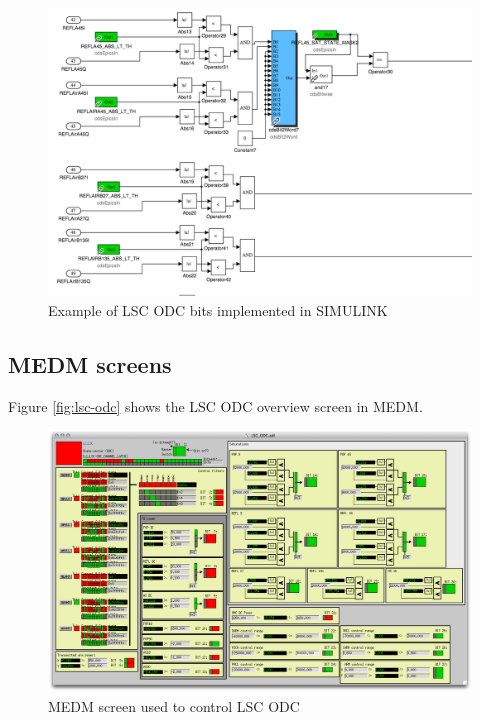 \begin{figure}[ht!]
\includegraphics[width=\textwidth]{figures/ODC/LSC-ODC-model}
\caption[LSC ODC SIMULINK Model Example]{Example of LSC ODC bits implemented in SIMULINK}
\end{figure}\label{fig:lsc-odc-model}

\subsection{MEDM screens}

Figure \ref{fig:lsc-odc} shows the LSC ODC overview screen in MEDM.

\begin{figure}[ht!]
\includegraphics[width=\textwidth]{figures/ODC/LSC_screen}
\caption[LSC ODC Overview Screen]{MEDM screen used to control LSC ODC}
\end{figure}\label{fig:lsc-odc}

